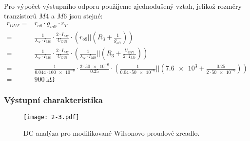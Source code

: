 Pro výpočet výstupního odporu použijeme zjednodušený vztah, jelikož rozměry tranzistorů \(M4\) a \(M6\) jsou stejné:
\begin{align*}
    r_{OUT} =& r_{o8} \cdot g_{m9}\cdot r_{T}  \\
            =& \frac{1}{\lambda_{N} \cdot I_{M8} } \cdot \frac{2\cdot I_{M7} }{U_{OV9} }\cdot \left(r_{o9} || \left(R_{3} +\frac{1}{g_{m7} }\right)\right)  \\
            =& \frac{1}{\lambda_{N} \cdot I_{M8} } \cdot \frac{2\cdot I_{M7} }{U_{OV9} }\cdot \left(\frac{1}{\lambda_{N} \cdot I_{M9} } || \left(R_{3} +\frac{U_{OV7} }{2\cdot I_{M7}}\right)\right)  \\
            =& \frac{1}{\num{0.044} \cdot \num{100e-6} } \cdot \frac{2\cdot \num{50e-6} }{\num{0.25} }\cdot \left(\frac{1}{\num{0.04} \cdot \num{50e-6} } || \left(\num{7.6e3} +\frac{\num{0.25} }{2\cdot \num{50e-6}}\right)\right)\\
            =&\qty{900}{\kilo\ohm} 
\end{align*}

\subsubsection{Výstupní charakteristika}
\begin{figure}[h!]
    \centering
    \texttt{[image: 2-3.pdf]}
    \caption{DC analýza pro modifikované Wilsonovo proudové zrcadlo.}
    \label{fig:2-3-pdf}
\end{figure}